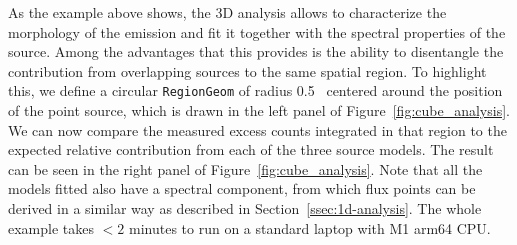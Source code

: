 \documentclass[longauth]{aa}
\newcommand{\todo}[1]{\textcolor{red}{TODO: #1}\PackageWarning{TODO:}{#1!}}
\newcommand{\code}[1]{\texttt{#1}}
\begin{document}
As the example above shows, the 3D analysis allows to characterize the
morphology of the emission and fit it together with the spectral properties of
the source.  Among the advantages that this provides is the ability to
disentangle the contribution from overlapping sources to the same spatial
region. To highlight this, we define a circular \code{RegionGeom} of radius
0.5\textdegree~ centered around the position of the point source, which is drawn
in the left panel of Figure~\ref{fig:cube_analysis}. We can now compare the
measured excess counts integrated in that region to the expected relative
contribution from each of the three source models. The result can be seen in the right
panel of Figure~\ref{fig:cube_analysis}. Note that all the models fitted also have a
spectral component, from which flux points can be derived in a similar way as described
in Section~\ref{ssec:1d-analysis}. The whole example takes $<2$ minutes to run on a standard
laptop with M1 arm64 CPU.
\end{document}
